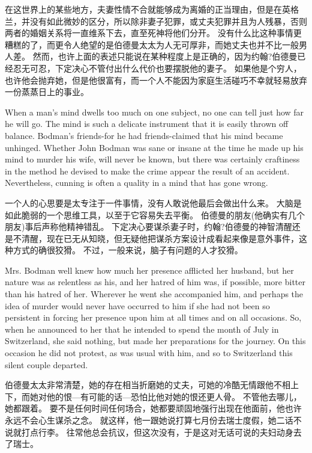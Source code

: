 \documentclass[cs4size, a4paper, 12pt]{article}
\newcounter{numpar}
\newcommand*{\newpar}{\numpar{}}
\begin{document}
	在这世界上的某些地方，夫妻性情不合就能够成为离婚的正当理由，但是在英格兰，并没有如此微妙的区分，所以除非妻子犯罪，或丈夫犯罪并且为人残暴，否则两者的婚姻关系将一直维系下去，直至死神将他们分开。 没有什么比这种事情更糟糕的了，而更令人绝望的是伯德曼太太为人无可厚非，而她丈夫也并不比一般男人差。 然而，也许上面的表述只能说在某种程度上是正确的，因为约翰?伯德曼已经忍无可忍，下定决心不管付出什么代价也要摆脱他的妻子。 如果他是个穷人，也许他会抛弃她，但是他很富有，而一个人不能因为家庭生活碰巧不幸就轻易放弃一份蒸蒸日上的事业。 
	
	\newpar When a man's mind dwells too much on one subject, no one can tell just how far he will go. The mind is such a delicate instrument that it is easily thrown off balance. Bodman's friends-for he had friends-claimed that his mind became unhinged. Whether John Bodman was sane or insane at the time he made up his mind to murder his wife, will never be known, but there was certainly craftiness in the method he devised to make the crime appear the result of an accident. Nevertheless, cunning is often a quality in a mind that has gone wrong.
	
	一个人的心思要是太专注于一件事情，没有人敢说他最后会做出什么来。 大脑是如此脆弱的一个思维工具，以至于它容易失去平衡。 伯德曼的朋友(他确实有几个朋友)事后声称他精神错乱。 下定决心要谋杀妻子时，约翰?伯德曼的神智清醒还是不清醒，现在已无从知晓，但无疑他把谋杀方案设计成看起来像是意外事件，这种方式的确很狡猾。 不过，一般来说，脑子有问题的人才狡猾。 
	
	\newpar Mrs. Bodman well knew how much her presence afflicted her husband, but her nature was as relentless as his, and her hatred of him was, if possible, more bitter than his hatred of her. Wherever he went she accompanied him, and perhaps the idea of murder would never have occurred to him if she had not been so persistent in forcing her presence upon him at all times and on all occasions. So, when he announced to her that he intended to spend the month of July in Switzerland, she said nothing, but made her preparations for the journey. On this occasion he did not protest, as was usual with him, and so to Switzerland this silent couple departed.
	
	伯德曼太太非常清楚，她的存在相当折磨她的丈夫，可她的冷酷无情跟他不相上下，而她对他的恨—有可能的话—恐怕比他对她的恨还更人骨。 不管他去哪儿，她都跟着。 要不是任何时间任何场合，她都要顽固地强行出现在他面前，他也许永远不会心生谋杀之念。 就这样，他一跟她说打算七月份去瑞士度假，她二话不说就打点行李。 往常他总会抗议，但这次没有，于是这对无话可说的夫妇动身去了瑞士。 
	
\end{document}
